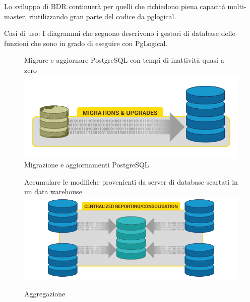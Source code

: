 Lo sviluppo di BDR continuerà per quelli che richiedono piena capacità multi-master, riutilizzando gran parte del codice da pglogical.


Casi di uso:
I diagrammi che seguono descrivono i gestori di database delle funzioni che sono in grado di eseguire con PgLogical.
\begin{figure}[htbp]
\centering
Migrare e aggiornare PostgreSQL con tempi di inattivit\`a quasi a zero
\includegraphics[scale=0.70]{img/pglogical_1.png}\\
\caption{Migrazione e aggiornamenti PostgreSQL \label{figura1} \cite{etichetta1}}
Accumulare le modifiche provenienti da server di database scartati in un data warehouse
\includegraphics[scale=0.70]{img/pglogical_2.png}\\
\caption{Aggregazione \label{figura2} 
\cite{etichetta2}}
\end{figure}
